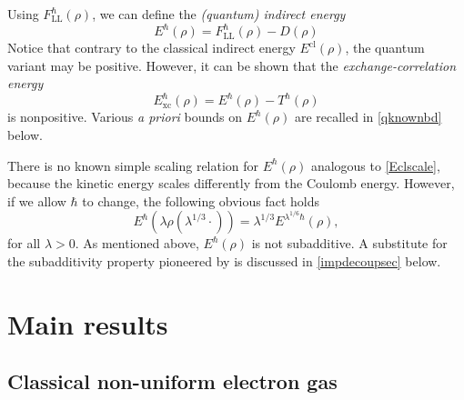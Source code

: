 \documentclass[final,onefignum,onetabnum,reqno]{amsart}
\theoremstyle{remark}
\newcommand{\cl}{\mathrm{cl}} %
\newcommand{\LL}{\mathrm{LL}} %
\newcommand{\xc}{\mathrm{xc}} %
\begin{document}
Using $F_\LL^\hbar(\rho)$, we can define the \emph{(quantum) indirect energy} 
$$
\boxed{E^\hbar(\rho)=F_\LL^\hbar(\rho)-D(\rho)}
$$
Notice that contrary to the classical indirect energy $E^\cl(\rho)$, the quantum variant may be positive. However, it can be shown that the \emph{exchange-correlation energy} 
$$
E_\xc^\hbar(\rho)=E^\hbar(\rho)-T^\hbar(\rho)
$$
is nonpositive. Various \emph{a priori} bounds on $E^\hbar(\rho)$ are recalled in \cref{qknownbd} below.

There is no known simple scaling relation for $E^\hbar(\rho)$ analogous to \cref{Eclscale}, because the kinetic energy scales differently from the Coulomb energy. However, if we allow $\hbar$ to change, the following obvious fact holds
\begin{equation}\label{Ehbarscale}
E^\hbar(\lambda\rho(\lambda^{1/3}\cdot))=\lambda^{1/3}E^{\lambda^{1/6}\hbar}(\rho),
\end{equation}
for all $\lambda>0$.
As mentioned above, $E^\hbar(\rho)$ is not subadditive. A substitute for the subadditivity property 
pioneered by \cite{lewin2020local} is discussed in \cref{impdecoupsec} below. 


\section{Main results}\label{sec:MR}

\subsection{Classical non-uniform electron gas}\label{clnuegsec}
\end{document}
